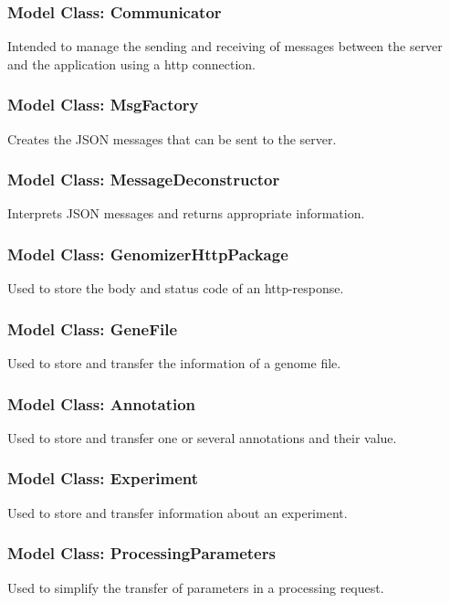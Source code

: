 \subsubsection{Model Class: Communicator}
Intended to manage the sending and receiving of messages between the server and the application using a http connection.
\subsubsection{Model Class: MsgFactory}
Creates the JSON messages that can be sent to the server.
\subsubsection{Model Class: MessageDeconstructor}
Interprets JSON messages and returns appropriate information.
\subsubsection{Model Class: GenomizerHttpPackage}
Used to store the body and status code of an http-response.
\subsubsection{Model Class: GeneFile}
Used to store and transfer the information of a genome file.
\subsubsection{Model Class: Annotation}
Used to store and transfer one or several annotations and their value.
\subsubsection{Model Class: Experiment}
Used to store and transfer information about an experiment.
\subsubsection{Model Class: ProcessingParameters}
Used to simplify the transfer of parameters in a processing request.
